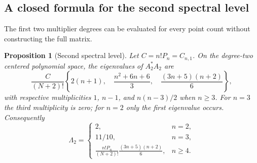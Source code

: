 \documentclass[11pt]{article}
\newtheorem{proposition}[theorem]{Proposition}
\theoremstyle{remark}
\numberwithin{equation}{section}
\begin{document}
\subsection{A closed formula for the second spectral level}
The first two multiplier degrees can be evaluated for every point
count without constructing the full matrix.

\begin{proposition}[Second spectral level]\label{prop:spectral-level-two}
Let $C=n!P_n=C_{n,1}$. On the degree-two centered polynomial space,
the eigenvalues of $A_2^*A_2$ are
\begin{equation}\label{eq:spectral-level-two-eigenvalues}
 \frac{C}{(N+2)!}\left\{
 2(n+1),\quad \frac{n^2+6n+6}{3},\quad
 \frac{(3n+5)(n+2)}6\right\},
\end{equation}
with respective multiplicities $1$, $n-1$, and $n(n-3)/2$ when
$n\ge3$. For $n=3$ the third multiplicity is zero; for $n=2$
only the first eigenvalue occurs. Consequently
\[
 \Lambda_2=
 \begin{cases}
 2,&n=2,\\[2pt]
 11/10,&n=3,\\[2pt]
 \displaystyle\frac{n!P_n}{(N+2)!}
       \frac{(3n+5)(n+2)}6,&n\ge4.
 \end{cases}
\]
\end{proposition}
\end{document}
